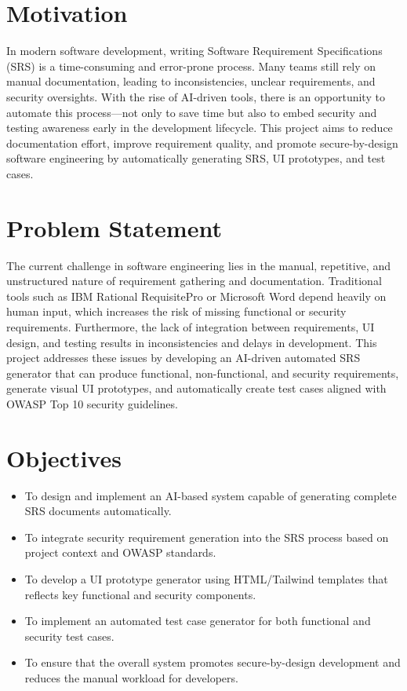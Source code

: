\documentclass[12pt,a4paper,oneside]{report}
\begin{document}
\section{Motivation}
In modern software development, writing Software Requirement Specifications (SRS) is a time-consuming and error-prone process. Many teams still rely on manual documentation, leading to inconsistencies, unclear requirements, and security oversights. With the rise of AI-driven tools, there is an opportunity to automate this process---not only to save time but also to embed security and testing awareness early in the development lifecycle. This project aims to reduce documentation effort, improve requirement quality, and promote secure-by-design software engineering by automatically generating SRS, UI prototypes, and test cases.

\section{Problem Statement}
The current challenge in software engineering lies in the manual, repetitive, and unstructured nature of requirement gathering and documentation. Traditional tools such as IBM Rational RequisitePro or Microsoft Word depend heavily on human input, which increases the risk of missing functional or security requirements. Furthermore, the lack of integration between requirements, UI design, and testing results in inconsistencies and delays in development. This project addresses these issues by developing an AI-driven automated SRS generator that can produce functional, non-functional, and security requirements, generate visual UI prototypes, and automatically create test cases aligned with OWASP Top 10 security guidelines.

\section{Objectives}
\begin{itemize}[leftmargin=*]
  \item To design and implement an AI-based system capable of generating complete SRS documents automatically.
  \item To integrate security requirement generation into the SRS process based on project context and OWASP standards.
  \item To develop a UI prototype generator using HTML/Tailwind templates that reflects key functional and security components.
  \item To implement an automated test case generator for both functional and security test cases.
  \item To ensure that the overall system promotes secure-by-design development and reduces the manual workload for developers.
\end{itemize}
\end{document}
